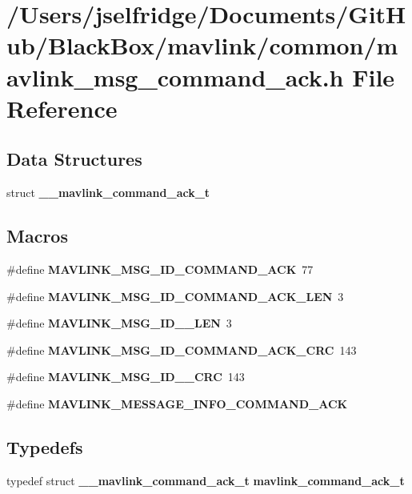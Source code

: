 \section{/\+Users/jselfridge/\+Documents/\+Git\+Hub/\+Black\+Box/mavlink/common/mavlink\+\_\+msg\+\_\+command\+\_\+ack.h File Reference}
\label{mavlink__msg__command__ack_8h}
\subsection*{Data Structures}
\begin{DoxyCompactItemize}
\item 
struct \textbf{ \+\_\+\+\_\+mavlink\+\_\+command\+\_\+ack\+\_\+t}
\end{DoxyCompactItemize}
\subsection*{Macros}
\begin{DoxyCompactItemize}
\item 
\#define \textbf{ M\+A\+V\+L\+I\+N\+K\+\_\+\+M\+S\+G\+\_\+\+I\+D\+\_\+\+C\+O\+M\+M\+A\+N\+D\+\_\+\+A\+CK}~77
\item 
\#define \textbf{ M\+A\+V\+L\+I\+N\+K\+\_\+\+M\+S\+G\+\_\+\+I\+D\+\_\+\+C\+O\+M\+M\+A\+N\+D\+\_\+\+A\+C\+K\+\_\+\+L\+EN}~3
\item 
\#define \textbf{ M\+A\+V\+L\+I\+N\+K\+\_\+\+M\+S\+G\+\_\+\+I\+D\+\_\+\_\+\+L\+EN}~3
\item 
\#define \textbf{ M\+A\+V\+L\+I\+N\+K\+\_\+\+M\+S\+G\+\_\+\+I\+D\+\_\+\+C\+O\+M\+M\+A\+N\+D\+\_\+\+A\+C\+K\+\_\+\+C\+RC}~143
\item 
\#define \textbf{ M\+A\+V\+L\+I\+N\+K\+\_\+\+M\+S\+G\+\_\+\+I\+D\+\_\+\_\+\+C\+RC}~143
\item 
\#define \textbf{ M\+A\+V\+L\+I\+N\+K\+\_\+\+M\+E\+S\+S\+A\+G\+E\+\_\+\+I\+N\+F\+O\+\_\+\+C\+O\+M\+M\+A\+N\+D\+\_\+\+A\+CK}
\end{DoxyCompactItemize}
\subsection*{Typedefs}
\begin{DoxyCompactItemize}
\item 
typedef struct \textbf{ \+\_\+\+\_\+mavlink\+\_\+command\+\_\+ack\+\_\+t} \textbf{ mavlink\+\_\+command\+\_\+ack\+\_\+t}
\end{DoxyCompactItemize}


